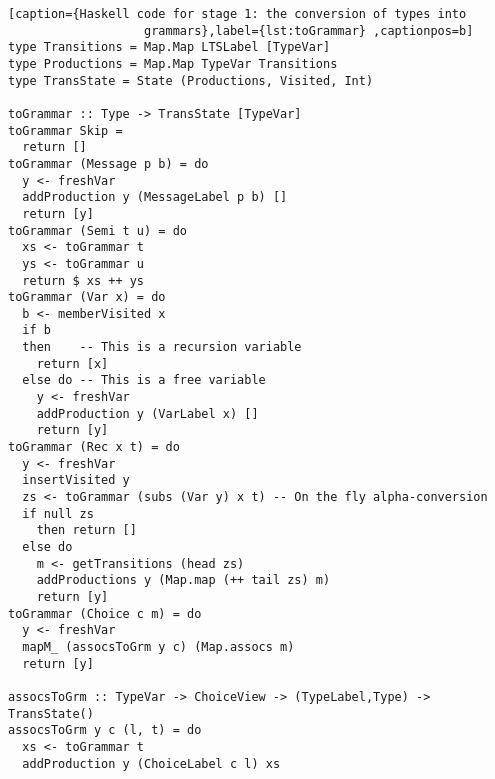 \begin{lstlisting}[caption={Haskell code for stage 1: the conversion of types into
                   grammars},label={lst:toGrammar} ,captionpos=b]
type Transitions = Map.Map LTSLabel [TypeVar]
type Productions = Map.Map TypeVar Transitions
type TransState = State (Productions, Visited, Int)

toGrammar :: Type -> TransState [TypeVar]
toGrammar Skip =
  return []
toGrammar (Message p b) = do
  y <- freshVar
  addProduction y (MessageLabel p b) []
  return [y]
toGrammar (Semi t u) = do
  xs <- toGrammar t
  ys <- toGrammar u
  return $ xs ++ ys
toGrammar (Var x) = do
  b <- memberVisited x
  if b
  then    -- This is a recursion variable
    return [x]
  else do -- This is a free variable
    y <- freshVar
    addProduction y (VarLabel x) []
    return [y]
toGrammar (Rec x t) = do
  y <- freshVar
  insertVisited y
  zs <- toGrammar (subs (Var y) x t) -- On the fly alpha-conversion
  if null zs
    then return []
  else do
    m <- getTransitions (head zs)
    addProductions y (Map.map (++ tail zs) m)
    return [y]
toGrammar (Choice c m) = do
  y <- freshVar
  mapM_ (assocsToGrm y c) (Map.assocs m)
  return [y]

assocsToGrm :: TypeVar -> ChoiceView -> (TypeLabel,Type) -> TransState()
assocsToGrm y c (l, t) = do
  xs <- toGrammar t
  addProduction y (ChoiceLabel c l) xs
\end{lstlisting}

